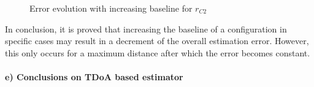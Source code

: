 \begin{figure}[!htbp]
	\captionsetup{justification=centering,margin=2cm}
	\caption{Error evolution with increasing baseline for $r_{C2}$}
	\label{fig:plot-baseline-increase-2}
\end{figure}

In conclusion, it is proved that increasing the baseline of a configuration in specific cases may result in a decrement of the overall estimation error. However, this only occurs for a maximum distance after which the error becomes constant. 

\paragraph{e) Conclusions on TDoA based estimator}

